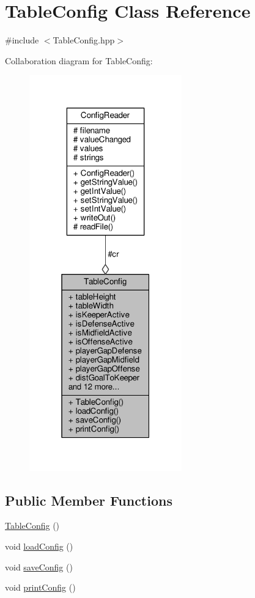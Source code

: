 \hypertarget{class_table_config}{}\section{Table\+Config Class Reference}
\label{class_table_config}


{\ttfamily \#include $<$Table\+Config.\+hpp$>$}



Collaboration diagram for Table\+Config\+:\nopagebreak
\begin{figure}[H]
\begin{center}
\leavevmode
\includegraphics[width=187pt]{class_table_config__coll__graph}
\end{center}
\end{figure}
\subsection*{Public Member Functions}
\begin{DoxyCompactItemize}
\item 
\hyperlink{class_table_config_aa00bc54e326c0a993d62b643477b139c}{Table\+Config} ()
\item 
void \hyperlink{class_table_config_a5892df7b864766d326451290b79757be}{load\+Config} ()
\item 
void \hyperlink{class_table_config_a1ae1eb31d65be7f73b8ddedf43fd2fa6}{save\+Config} ()
\item 
void \hyperlink{class_table_config_a7f0be8bf53f6fc2bff25d713511056bd}{print\+Config} ()
\end{DoxyCompactItemize}
